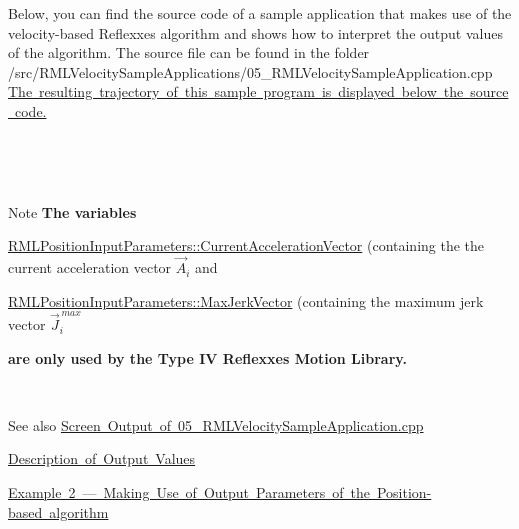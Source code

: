 Below, you can find the source code of a sample application that makes use of the velocity-\/based Reflexxes algorithm and shows how to interpret the output values of the algorithm. The source file can be found in the folder~\newline
~\newline
{\ttfamily /src/\+R\+M\+L\+Velocity\+Sample\+Applications/05\+\_\+\+R\+M\+L\+Velocity\+Sample\+Application.cpp}~\newline
~\newline
\mbox{\hyperlink{page_Code_05_RMLVelocitySampleApplication_anc_VelocityExample5}{The resulting trajectory of this sample program is displayed below the source code.}} ~\newline
~\newline
 
\begin{DoxyCodeInclude}{0}
\end{DoxyCodeInclude}


~\newline
~\newline
\label{page_Code_05_RMLVelocitySampleApplication_anc_VelocityExample5}%
%
 

~\newline
 \begin{DoxyNote}{Note}
{\bfseries{The variables}}~\newline
~\newline

\begin{DoxyItemize}
\item \mbox{\hyperlink{classRMLInputParameters_a423bf4b1ef337cbf6eee22fe2e2502c1}{R\+M\+L\+Position\+Input\+Parameters\+::\+Current\+Acceleration\+Vector}} (containing the the current acceleration vector $ \vec{A}_i$ and~\newline
~\newline
 
\item \mbox{\hyperlink{classRMLInputParameters_a5968ce643868260410f149996c446b66}{R\+M\+L\+Position\+Input\+Parameters\+::\+Max\+Jerk\+Vector}} (containing the maximum jerk vector $ \vec{J}_i^{\,max} $ ~\newline
~\newline
 
\end{DoxyItemize}{\bfseries{are only used by the Type IV Reflexxes Motion Library.}}
\end{DoxyNote}
~\newline
~\newline
 \begin{DoxySeeAlso}{See also}
\mbox{\hyperlink{page_Result_05_RMLVelocitySampleApplication}{Screen Output of 05\+\_\+\+R\+M\+L\+Velocity\+Sample\+Application.\+cpp}} 

\mbox{\hyperlink{page_OutputValues}{Description of Output Values}} 

\mbox{\hyperlink{page_Code_02_RMLPositionSampleApplication}{Example 2 --- Making Use of Output Parameters of the Position-\/based algorithm}} 
\end{DoxySeeAlso}
